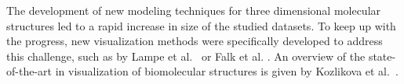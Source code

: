 \documentclass{egpubl}
\begin{document}
	
		
	
	The development of new modeling techniques for three dimensional molecular structures led to a rapid increase in size of the studied datasets.
	To keep up with the progress, new visualization methods were specifically developed to address this challenge, such as by Lampe et al.~\cite{lampe2007two} or Falk et al. \cite{falk2013atomistic}. 
	An overview of the state-of-the-art in visualization of biomolecular structures is given by Kozlikova et al.~\cite{kozlikova2015visualization}. 
	
\end{document}
